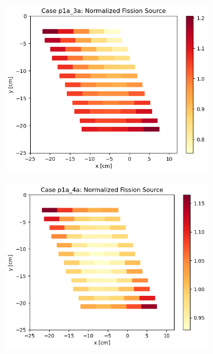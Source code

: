 \documentclass[letterpaper,11pt]{report}
\begin{document}
\begin{figure}[H]
\begin{subfigure}{.33\textwidth}
        \caption{}
      \end{subfigure}
      \begin{subfigure}{.33\textwidth}
        \centering
        \includegraphics[width=\linewidth]{../../phase1a/case3a/analysis_output/p1a_3a_c.png}
        \caption{}
      \end{subfigure}
      \begin{subfigure}{.33\textwidth}
        \centering
        \includegraphics[width=\linewidth]{../../phase1a/case4a/analysis_output/p1a_4a_c.png}
        \caption{}
      \end{subfigure}

\end{figure}
\end{document}
